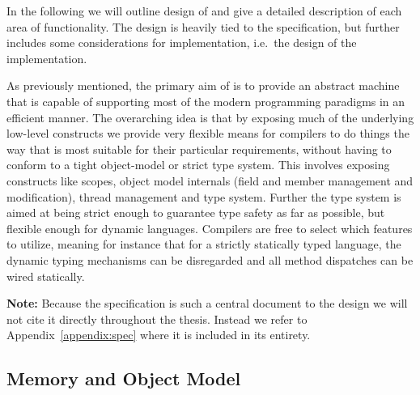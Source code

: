 In the following we will outline  design of \thename{} and give a detailed
description of each area of functionality. The design is heavily tied to the
\thename{} specification, but further includes some considerations for
implementation, i.e.~the design of the implementation.

As previously mentioned, the primary aim of \thename{} is to provide an abstract
machine that is capable of supporting most of the modern programming paradigms
in an efficient manner. The overarching idea is that by exposing much of the
underlying low-level constructs we provide very flexible means for compilers to
do things the way that is most suitable for their particular requirements,
without having to conform to a tight object-model or strict type system. This
involves exposing constructs like scopes, object model internals (field and
member management and modification), thread management and type system. Further
the type system is aimed at being strict enough to guarantee type safety as far
as possible, but flexible enough for dynamic languages. Compilers are free to
select which features to utilize, meaning for instance that for a strictly
statically typed language, the dynamic typing mechanisms can be disregarded and
all method dispatches can be wired statically.

\textbf{Note:} Because the specification is such a central document to the
design we will not cite it directly throughout the thesis. Instead we refer to
Appendix~\ref{appendix:spec} where it is included in its entirety.

\subsection{Memory and Object Model}

